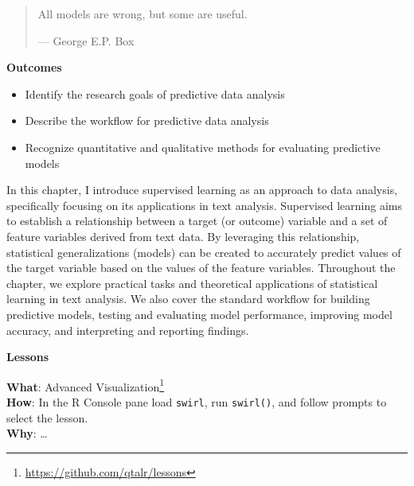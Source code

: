 \documentclass[
  letterpaper,
  DIV=11,
  numbers=noendperiod]{scrreprt}
\providecommand{\tightlist}{%
  \setlength{\itemsep}{0pt}\setlength{\parskip}{0pt}}\usepackage{longtable,booktabs,array}
\theoremstyle{definition}
\theoremstyle{remark}
\DeclareRobustCommand{\href}[2]{#2\footnote{\url{#1}}}
\begin{document}
\begin{quote}
All models are wrong, but some are useful.

--- George E.P. Box
\end{quote}

\begin{tcolorbox}[enhanced jigsaw, leftrule=.75mm, colframe=quarto-callout-color-frame, colback=white, rightrule=.15mm, opacityback=0, arc=.35mm, breakable, bottomrule=.15mm, left=2mm, toprule=.15mm]

\textbf{ Outcomes}

\begin{itemize}
\tightlist
\item
  Identify the research goals of predictive data analysis
\item
  Describe the workflow for predictive data analysis
\item
  Recognize quantitative and qualitative methods for evaluating
  predictive models
\end{itemize}

\end{tcolorbox}

In this chapter, I introduce supervised learning as an approach to data
analysis, specifically focusing on its applications in text analysis.
Supervised learning aims to establish a relationship between a target
(or outcome) variable and a set of feature variables derived from text
data. By leveraging this relationship, statistical generalizations
(models) can be created to accurately predict values of the target
variable based on the values of the feature variables. Throughout the
chapter, we explore practical tasks and theoretical applications of
statistical learning in text analysis. We also cover the standard
workflow for building predictive models, testing and evaluating model
performance, improving model accuracy, and interpreting and reporting
findings.

\begin{tcolorbox}[enhanced jigsaw, leftrule=.75mm, colframe=quarto-callout-color-frame, colback=white, rightrule=.15mm, opacityback=0, arc=.35mm, breakable, bottomrule=.15mm, left=2mm, toprule=.15mm]

\textbf{ Lessons}

\textbf{What}: \href{https://github.com/qtalr/lessons}{Advanced
Visualization}\\
\textbf{How}: In the R Console pane load \texttt{swirl}, run
\texttt{swirl()}, and follow prompts to select the lesson.\\
\textbf{Why}: \ldots{} 

\end{tcolorbox}
\end{document}
